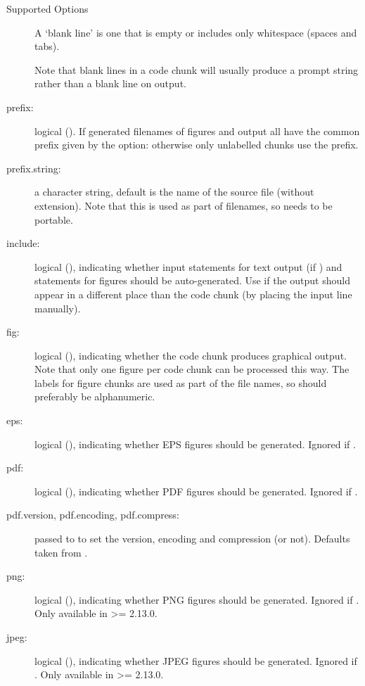 \begin{Section}{Supported Options}
\begin{description}
A `blank line' is one that is empty or includes only
whitespace (spaces and tabs).

Note that blank lines in a code chunk will usually produce a
prompt string rather than a blank line on output.


\item[prefix:] logical ().  If  generated
filenames of figures and output all have the common prefix given
by the  option: otherwise only unlabelled
chunks use the prefix.

\item[prefix.string:] a character string, default is the name of the
source file (without extension).  Note that this is used as part
of filenames, so needs to be portable.

\item[include:] logical (), indicating whether input
statements for text output (if ) and
 statements for figures should be
auto-generated.  Use  if the output should
appear in a different place than the code chunk (by placing the
input line manually).

\item[fig:] logical (), indicating whether the code
chunk produces graphical output.  Note that only one figure per
code chunk can be processed this way.  The labels for figure
chunks are used as part of the file names, so should preferably be
alphanumeric.

\item[eps:] logical (), indicating whether EPS figures
should be generated.  Ignored if .

\item[pdf:] logical (), indicating whether PDF figures
should be generated.  Ignored if .

\item[pdf.version, pdf.encoding, pdf.compress:] passed to
 to set the version, encoding and compression (or
not).  Defaults taken from .

\item[png:] logical (), indicating whether PNG figures
should be generated.  Ignored if .  Only
available in \R{} >= 2.13.0.

\item[jpeg:] logical (), indicating whether JPEG figures
should be generated.  Ignored if .  Only
available in \R{} >= 2.13.0.


\end{description}
\end{Section}
